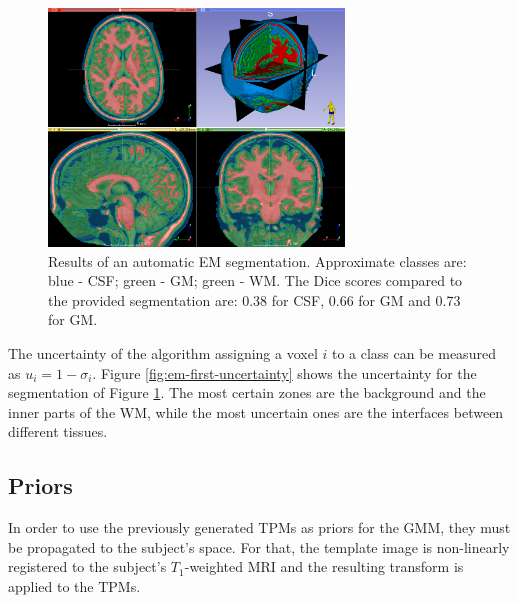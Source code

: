 \begin{figure}
  \centering
  \includegraphics[width=0.7\textwidth]{figures/em_first}
  \caption{Results of an automatic EM segmentation. Approximate classes are: blue - CSF; green - GM; green - WM. The Dice scores compared to the provided segmentation are: 0.38 for CSF, 0.66 for GM and 0.73 for GM.}
  \label{fig:em-first}
\end{figure}

The uncertainty of the algorithm assigning a voxel $i$ to a class can be measured as $u_i = 1 - \sigma_i$. Figure \ref{fig:em-first-uncertainty} shows the uncertainty for the segmentation of Figure \ref{fig:em-first}. The most certain zones are the background and the inner parts of the WM, while the most uncertain ones are the interfaces between different tissues.




\subsection{Priors}
In order to use the previously generated TPMs as priors for the GMM, they must be propagated to the subject's space. For that, the template image is non-linearly registered to the subject's $T_1$-weighted MRI and the resulting transform is applied to the TPMs.


